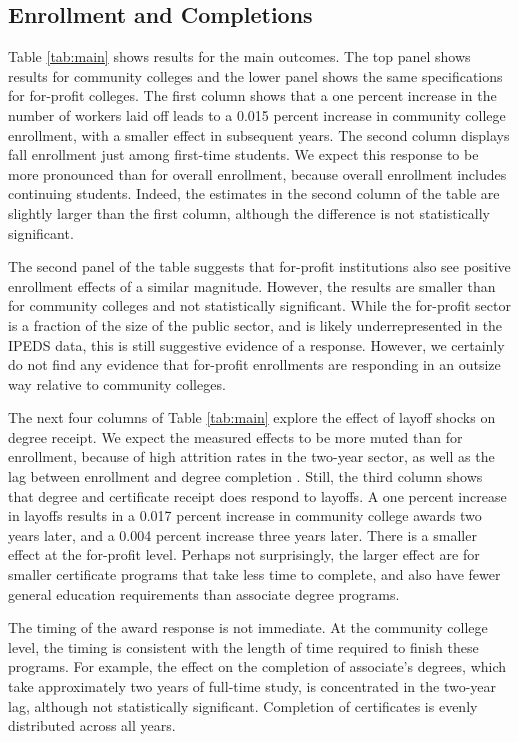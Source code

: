 \subsection{Enrollment and Completions}

Table \ref{tab:main} shows  results for the main outcomes. The top panel shows results for community colleges and the lower panel shows the same specifications for for-profit colleges. The first column shows that a one percent increase in the number of workers laid off leads to a 0.015 percent increase in community college enrollment, with a smaller effect in subsequent years. The second column displays fall enrollment just among first-time students. We expect this response to be more pronounced than for overall enrollment, because overall enrollment includes continuing students. Indeed, the estimates in the second column of the table are slightly larger than the first column, although the difference is not statistically significant. 

The second panel of the table suggests that for-profit institutions also see positive enrollment effects of a similar magnitude. However, the results are smaller than for community colleges and not statistically significant. While the for-profit sector is a fraction of the size of the public sector, and is likely underrepresented in the IPEDS data, this is still suggestive evidence of a response. However, we certainly do not find any evidence that for-profit enrollments are responding in an outsize way relative to community colleges.

The next four columns of Table \ref{tab:main} explore the effect of layoff shocks on degree receipt. We expect the measured effects to be more muted than for enrollment, because of high attrition rates in the two-year sector, as well as the lag between enrollment and degree completion \citep{CBJK2008}. Still, the third column shows that degree and certificate receipt does respond to layoffs. A one percent increase in layoffs results in a 0.017 percent increase in community college awards two years later, and a 0.004 percent increase three years later. There is a smaller effect at the for-profit level.  Perhaps not surprisingly, the larger effect are for smaller certificate programs that take less time to complete, and also have fewer general education requirements than associate degree programs. 

The timing of the award response is not immediate. At the community college level, the timing is consistent with the length of time required to finish these programs. For example, the effect on the completion of associate's degrees, which take approximately two years of full-time study, is concentrated in the two-year lag, although not statistically significant. Completion of certificates is evenly distributed across all years. 


